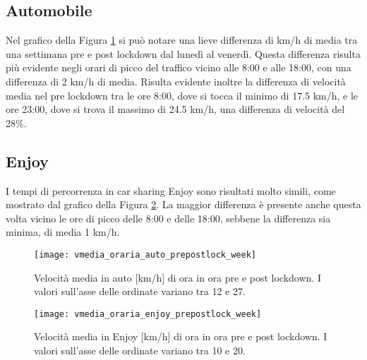 \subsection{Automobile}

Nel grafico della Figura \ref{image:22} si può notare una lieve differenza di km/h di media tra una settimana pre e post lockdown dal lunedì al venerdì. Questa differenza risulta più evidente negli orari di picco del traffico vicino alle 8:00 e alle 18:00, con una differenza di 2 km/h di media. Risulta evidente inoltre la differenza di velocità media nel pre lockdown tra le ore 8:00, dove si tocca il minimo di 17.5 km/h, e le ore 23:00, dove si trova il massimo di 24.5 km/h, una differenza di velocità del 28\%.

\subsection{Enjoy}

I tempi di percorrenza in car sharing Enjoy sono risultati molto simili, come mostrato dal grafico della Figura \ref{image:24}. La maggior differenza è presente anche questa volta vicino le ore di picco delle 8:00 e delle 18:00, sebbene la differenza sia minima, di media 1 km/h.

\begin{figure}[H]
	\centering
	\texttt{[image: vmedia\_oraria\_auto\_prepostlock\_week]}
	\caption{Velocità media in auto [km/h] di ora in ora pre e post lockdown. I valori sull'asse delle ordinate variano tra 12 e 27.}
	\label{image:22}
\end{figure}

\begin{figure}[H]
	\centering
	\texttt{[image: vmedia\_oraria\_enjoy\_prepostlock\_week]}
	\caption{Velocità media in Enjoy [km/h] di ora in ora pre e post lockdown. I valori sull'asse delle ordinate variano tra 10 e 20.}
	\label{image:24}
\end{figure}












